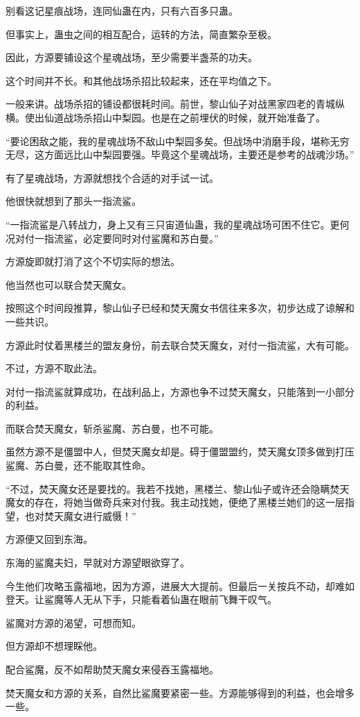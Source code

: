 \begin{this_body}
别看这记星痕战场，连同仙蛊在内，只有六百多只蛊。

但事实上，蛊虫之间的相互配合，运转的方法，简直繁杂至极。

因此，方源要铺设这个星魂战场，至少需要半盏茶的功夫。

这个时间并不长。和其他战场杀招比较起来，还在平均值之下。

一般来讲。战场杀招的铺设都很耗时间。前世，黎山仙子对战黑家四老的青城纵横。使出仙道战场杀招山中梨园。也是在之前埋伏的时候，就开始准备了。

“要论困敌之能，我的星魂战场不敌山中梨园多矣。但战场中消磨手段，堪称无穷无尽，这方面远比山中梨园要强。毕竟这个星魂战场，主要还是参考的战魂沙场。”

有了星魂战场，方源就想找个合适的对手试一试。

他很快就想到了那头一指流鲨。

“一指流鲨是八转战力，身上又有三只宙道仙蛊，我的星魂战场可困不住它。更何况对付一指流鲨，必定要同时对付鲨魔和苏白曼。”

方源旋即就打消了这个不切实际的想法。

他当然也可以联合焚天魔女。

按照这个时间段推算，黎山仙子已经和焚天魔女书信往来多次，初步达成了谅解和一些共识。

方源此时仗着黑楼兰的盟友身份，前去联合焚天魔女，对付一指流鲨，大有可能。

不过，方源不取此法。

对付一指流鲨就算成功，在战利品上，方源也争不过焚天魔女，只能落到一小部分的利益。

而联合焚天魔女，斩杀鲨魔、苏白曼，也不可能。

虽然方源不是僵盟中人，但焚天魔女却是。碍于僵盟盟约，焚天魔女顶多做到打压鲨魔、苏白曼，还不能取其性命。

“不过，焚天魔女还是要找的。我若不找她，黑楼兰、黎山仙子或许还会隐瞒焚天魔女的存在，将她当做奇兵来对付我。我主动找她，便绝了黑楼兰她们的这一层指望，也对焚天魔女进行威慑！”

方源便又回到东海。

东海的鲨魔夫妇，早就对方源望眼欲穿了。

今生他们攻略玉露福地，因为方源，进展大大提前。但最后一关按兵不动，却难如登天。让鲨魔等人无从下手，只能看着仙蛊在眼前飞舞干叹气。

鲨魔对方源的渴望，可想而知。

但方源却不想理睬他。

配合鲨魔，反不如帮助焚天魔女来侵吞玉露福地。

焚天魔女和方源的关系，自然比鲨魔要紧密一些。方源能够得到的利益，也会增多一些。

\end{this_body}


